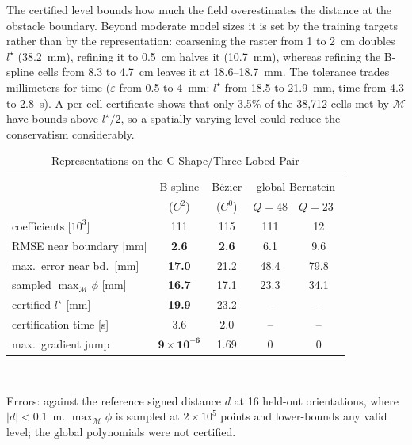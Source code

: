 \documentclass[journal]{IEEEtran}
\theoremstyle{definition}
\newcommand{\Mset}{\mathcal{M}}
\begin{document}
The certified level bounds how much the field overestimates the distance at the obstacle boundary.
Beyond moderate model sizes it is set by the training targets rather than by the representation:
coarsening the raster from 1 to 2~cm doubles $l^\star$ (38.2~mm), refining it to 0.5~cm halves it
(10.7~mm), whereas refining the B-spline cells from 8.3 to 4.7~cm leaves it at 18.6--18.7~mm. The
tolerance trades millimeters for time ($\varepsilon$ from 0.5 to 4~mm: $l^\star$ from 18.5 to
21.9~mm, time from 4.3 to 2.8~s). A per-cell certificate shows that only 3.5\% of the 38{,}712 cells
met by $\Mset$ have bounds above $l^\star/2$, so a spatially varying level could reduce the
conservatism considerably.

\begin{table}[t]
\caption{Representations on the C-Shape/Three-Lobed Pair}
\label{tab:repr}
\centering
\footnotesize
\setlength{\tabcolsep}{2.5pt}
\renewcommand{\arraystretch}{1.05}
\begin{tabular}{lcccc}
\toprule
& B-spline & B\'ezier & \multicolumn{2}{c}{global Bernstein}\\
& ($C^2$) & ($C^0$) & $Q{=}48$ & $Q{=}23$~\cite{jo2026geometry}\\
\midrule
coefficients [$10^3$] & 111 & 115 & 111 & 12\\
RMSE near boundary [mm] & \textbf{2.6} & \textbf{2.6} & 6.1 & 9.6\\
max.\ error near bd.\ [mm] & \textbf{17.0} & 21.2 & 48.4 & 79.8\\
sampled $\max_{\Mset}\phi$ [mm] & \textbf{16.7} & 17.1 & 23.3 & 34.1\\
certified $l^\star$ [mm] & \textbf{19.9} & 23.2 & -- & --\\
certification time [s] & 3.6 & 2.0 & -- & --\\
max.\ gradient jump & $\mathbf{9{\times}10^{-6}}$ & 1.69 & 0 & 0\\
\bottomrule
\end{tabular}
\\[3pt]
\parbox{\columnwidth}{\footnotesize Errors: against the reference signed distance $d$ at 16 held-out
orientations, where $|d|<0.1$~m.
$\max_{\Mset}\phi$ is sampled at $2\times10^5$ points and lower-bounds any valid level; the global
polynomials were not certified.}
\end{table}
\end{document}
